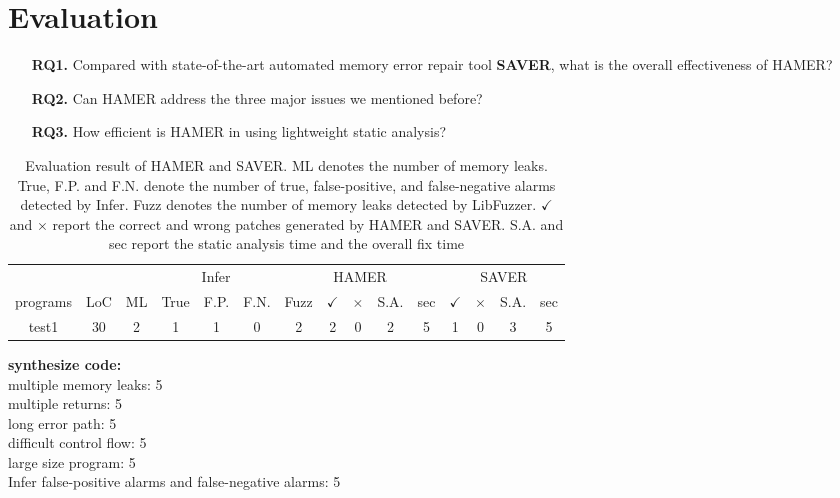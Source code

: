 \documentclass[a4paper,11pt,oneside,openany]{book}
\begin{document}

\chapter{Evaluation}
\begin{itemize}
\item[\textbf{RQ1.}] Compared with state-of-the-art automated memory error repair tool \textbf{SAVER}, what is the overall effectiveness of HAMER?
\item[\textbf{RQ2.}] Can HAMER address the three major issues we mentioned before? 
\item[\textbf{RQ3.}] How efficient is HAMER in using lightweight static analysis?
\end{itemize}

\begin{table}[h]
  \caption[Evaluation result]{Evaluation result of HAMER and SAVER. ML denotes the number of memory leaks. True, F.P. and F.N. denote the number of true, false-positive, and false-negative alarms detected by Infer. Fuzz denotes the number of memory leaks detected by LibFuzzer. $\checkmark$ and $\times$ report the correct and wrong patches generated by HAMER and SAVER. S.A. and sec report the static analysis time and the overall fix time }
  \label{evaluationresult}
  \centering
  \begin{tabular}{ccc|ccc|ccccc|cccc}
                 &        &           &  \multicolumn{3}{|c|}{Infer} & \multicolumn{5}{|c|}{HAMER} &  \multicolumn{4}{|c}{SAVER} \\
   programs& LoC & ML     & True& F.P. & F.N. & Fuzz & $\checkmark$ & $\times$ & S.A. & sec & $\checkmark$ &$\times$ & S.A.& sec \\
    \hline
    test1     & 30    & 2        & 1     & 1     & 0     & 2       & 2                    & 0             &   2   & 5    & 1                     & 0           &    3  & 5 \\
    \hline
  \end{tabular}
\end{table}
\textbf{synthesize code:}\\
multiple memory leaks: 5 \\
multiple returns: 5 \\
long error path: 5 \\
difficult control flow: 5 \\
large size program: 5 \\
Infer false-positive alarms and false-negative alarms: 5 \\
\end{document}
